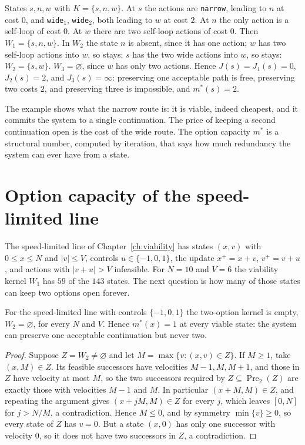 \begin{example}\label{ex:narrow}
States $s,n,w$ with $K=\{s,n,w\}$. At $s$ the actions are \texttt{narrow}, leading to $n$ at cost $0$, and \texttt{wide}$_1$, \texttt{wide}$_2$, both leading to $w$ at cost $2$. At $n$ the only action is a self-loop of cost $0$. At $w$ there are two self-loop actions of cost $0$. Then $W_1=\{s,n,w\}$. In $W_2$ the state $n$ is absent, since it has one action; $w$ has two self-loop actions into $w$, so stays; $s$ has the two wide actions into $w$, so stays: $W_2=\{s,w\}$. $W_3=\varnothing$, since $w$ has only two actions. Hence $J(s)=J_1(s)=0$, $J_2(s)=2$, and $J_3(s)=\infty$: preserving one acceptable path is free, preserving two costs $2$, and preserving three is impossible, and $m^{*}(s)=2$.
\end{example}

The example shows what the narrow route is: it is viable, indeed cheapest, and it commits the system to a single continuation. The price of keeping a second continuation open is the cost of the wide route. The option capacity $m^{*}$ is a structural number, computed by iteration, that says how much redundancy the system can ever have from a state.


\section{Option capacity of the speed-limited line}\label{sec:line-options}

The speed-limited line of Chapter~\ref{ch:viability} has states $(x,v)$ with $0\le x\le N$ and $|v|\le V$, controls $u\in\{-1,0,1\}$, the update $x^{+}=x+v$, $v^{+}=v+u$, and actions with $|v+u|>V$ infeasible. For $N=10$ and $V=6$ the viability kernel $W_1$ has $59$ of the $143$ states. The next question is how many of those states can keep two options open forever.

\begin{newresult}\label{prop:line-w2}
For the speed-limited line with controls $\{-1,0,1\}$ the two-option kernel is empty, $W_2=\varnothing$, for every $N$ and $V$. Hence $m^{*}(x)=1$ at every viable state: the system can preserve one acceptable continuation but never two.
\end{newresult}
\begin{proof}
Suppose $Z=W_2\ne\varnothing$ and let $M=\max\{v:(x,v)\in Z\}$. If $M\ge1$, take $(x,M)\in Z$. Its feasible successors have velocities $M-1,M,M+1$, and those in $Z$ have velocity at most $M$, so the two successors required by $Z\subseteq\operatorname{Pre}_2(Z)$ are exactly those with velocities $M-1$ and $M$. In particular $(x+M,M)\in Z$, and repeating the argument gives $(x+jM,M)\in Z$ for every $j$, which leaves $[0,N]$ for $j>N/M$, a contradiction. Hence $M\le0$, and by symmetry $\min\{v\}\ge0$, so every state of $Z$ has $v=0$. But a state $(x,0)$ has only one successor with velocity $0$, so it does not have two successors in $Z$, a contradiction.
\end{proof}

